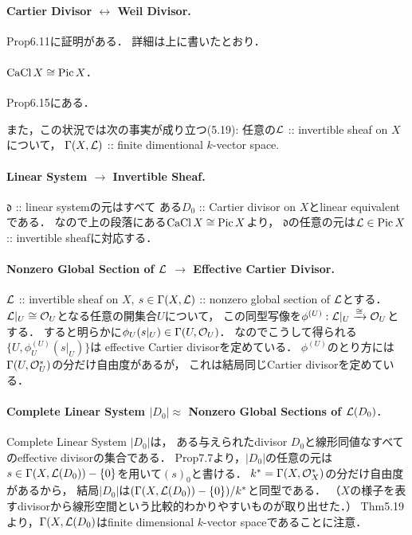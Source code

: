 \documentclass[a4paper]{jsarticle}
\newcommand{\CaCl}{\operatorname{CaCl}}
\newcommand{\Pic}{\operatorname{Pic}}
\newcommand{\lsd}{\mathfrak{d}} %
\begin{document}
    \paragraph{Cartier Divisor $\leftrightarrow$ Weil Divisor.}
    Prop6.11に証明がある．
    詳細は上に書いたとおり．

    \paragraph{$\CaCl X \iso \Pic X$.}
    Prop6.15にある．

    また，この状況では次の事実が成り立つ(5.19):
    任意の$\mathcal{L}$ :: invertible sheaf on $X$について，
    $\Gamma(X,\mathcal{L})$ :: finite dimentional $k$-vector space.

    \paragraph{Linear System $\rightarrow$ Invertible Sheaf.}
    $\lsd$ :: linear systemの元はすべて
    ある$D_0$ :: Cartier divisor on $X$とlinear equivalentである．
    なので上の段落にある$\CaCl X \iso \Pic X$より，
    $\lsd$の任意の元は$\shL \in \Pic X$ :: invertible sheafに対応する．

    \paragraph{Nonzero Global Section of $\mathcal{L}$ $\rightarrow$ Effective Cartier Divisor.}
    $\mathcal{L}$ :: invertible sheaf on $X$,
    $s \in \Gamma(X,\mathcal{L})$ :: nonzero global section of $\mathcal{L}$とする．
    $\mathcal{L}|_U \cong \mathcal{O}_U$となる任意の開集合$U$について，
    この同型写像を$\phi^{(U)}: \mathcal{L}|_U \xrightarrow{\cong} \mathcal{O}_U$とする．
    すると明らかに$\phi_U(s|_U) \in \Gamma(U,\mathcal{O}_U)$．
    なのでこうして得られる$\{U, \phi^{(U)}_U(s|_U)\}$は
    effective Cartier divisorを定めている．
    $\phi^{(U)}$のとり方には$\Gamma(U,\mathcal{O}_U^*)$の分だけ自由度があるが，
    これは結局同じCartier divisorを定めている．

    \paragraph{Complete Linear System $|D_0| $$\approx$ Nonzero Global Sections of $\mathcal{L}(D_0)$.}
    Complete Linear System $|D_0|$は，
    ある与えられたdivisor $D_0$と線形同値なすべてのeffective divisorの集合である．
    Prop7.7より，$|D_0|$の任意の元は$s \in \Gamma(X,\mathcal{L}(D_0))-\{0\}$を用いて$(s)_0$と書ける．
    $k^*=\Gamma(X,\mathcal{O}_X^*)$の分だけ自由度があるから，
    結局$|D_0|$は$(\Gamma(X,\mathcal{L}(D_0))-\{0\})/k^*$と同型である．
    （$X$の様子を表すdivisorから線形空間という比較的わかりやすいものが取り出せた．）
    Thm5.19より，$\Gamma(X,\mathcal{L}(D_0)$はfinite dimensional $k$-vector spaceであることに注意．
\end{document}
